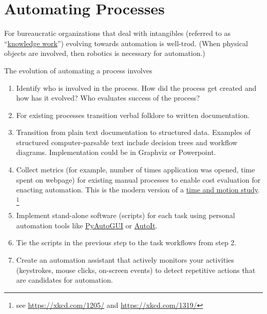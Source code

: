 \section{Automating Processes\label{sec:automating-processes}}



For bureaucratic organizations that deal with intangibles (referred to as ``\href{https://en.wikipedia.org/wiki/Knowledge_worker}{knowledge work}'') evolving towards automation is well-trod.  (When physical objects are involved, then robotics is necessary for automation.)

The evolution of automating a process involves
\begin{enumerate}
    \item Identify who is involved in the process. How did the process get created and how has it evolved? Who evaluates success of the process? 
    \item For existing processes transition verbal folklore to written documentation.
    \item Transition from plain text documentation to structured data. Examples of structured computer-parsable text include  decision trees and workflow diagrams. Implementation could be in Graphviz or Powerpoint.
    \item Collect metrics (for example, number of times application was opened, time spent on webpage) for existing manual processes to enable cost evaluation for enacting automation. This is the modern version of a \href{https://en.wikipedia.org/wiki/Time_and_motion_study}{time and motion study}.
    \footnote{see \href{https://xkcd.com/1205/}{https://xkcd.com/1205/} and \href{https://xkcd.com/1319/}{https://xkcd.com/1319/}}
    \item Implement stand-alone software (scripts) for each task using personal automation tools like \href{https://pyautogui.readthedocs.io/en/latest/}{PyAutoGUI} or \href{https://www.autoitscript.com/site/}{AutoIt}.
    \item Tie the scripts in the previous step to the task workflows from step 2.
    \item Create an automation assistant that actively monitors your activities (keystrokes, mouse clicks, on-screen events) to detect repetitive actions that are candidates for automation.
\end{enumerate}

